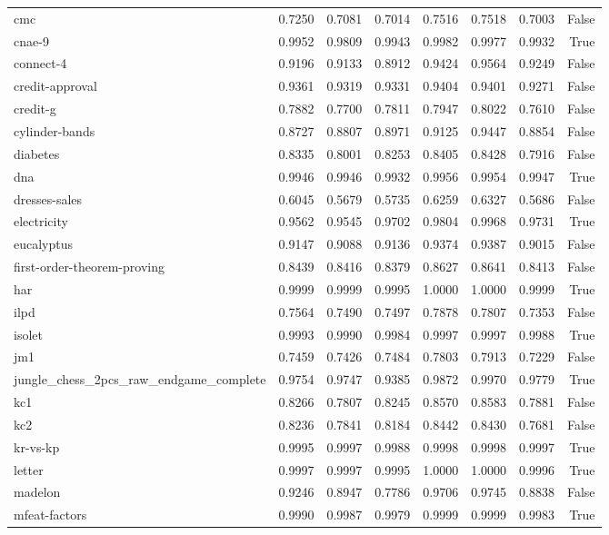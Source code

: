 \begin{table}[htbp]
\begin{tabular}{lrrrrrrr}
cmc & 0.7250 & 0.7081 & 0.7014 & 0.7516 & 0.7518 & 0.7003 & False \\
cnae-9 & 0.9952 & 0.9809 & 0.9943 & 0.9982 & 0.9977 & 0.9932 & True \\
connect-4 & 0.9196 & 0.9133 & 0.8912 & 0.9424 & 0.9564 & 0.9249 & False \\
credit-approval & 0.9361 & 0.9319 & 0.9331 & 0.9404 & 0.9401 & 0.9271 & False \\
credit-g & 0.7882 & 0.7700 & 0.7811 & 0.7947 & 0.8022 & 0.7610 & False \\
cylinder-bands & 0.8727 & 0.8807 & 0.8971 & 0.9125 & 0.9447 & 0.8854 & False \\
diabetes & 0.8335 & 0.8001 & 0.8253 & 0.8405 & 0.8428 & 0.7916 & False \\
dna & 0.9946 & 0.9946 & 0.9932 & 0.9956 & 0.9954 & 0.9947 & True \\
dresses-sales & 0.6045 & 0.5679 & 0.5735 & 0.6259 & 0.6327 & 0.5686 & False \\
electricity & 0.9562 & 0.9545 & 0.9702 & 0.9804 & 0.9968 & 0.9731 & True \\
eucalyptus & 0.9147 & 0.9088 & 0.9136 & 0.9374 & 0.9387 & 0.9015 & False \\
first-order-theorem-proving & 0.8439 & 0.8416 & 0.8379 & 0.8627 & 0.8641 & 0.8413 & False \\
har & 0.9999 & 0.9999 & 0.9995 & 1.0000 & 1.0000 & 0.9999 & True \\
ilpd & 0.7564 & 0.7490 & 0.7497 & 0.7878 & 0.7807 & 0.7353 & False \\
isolet & 0.9993 & 0.9990 & 0.9984 & 0.9997 & 0.9997 & 0.9988 & True \\
jm1 & 0.7459 & 0.7426 & 0.7484 & 0.7803 & 0.7913 & 0.7229 & False \\
jungle\_chess\_2pcs\_raw\_endgame\_complete & 0.9754 & 0.9747 & 0.9385 & 0.9872 & 0.9970 & 0.9779 & True \\
kc1 & 0.8266 & 0.7807 & 0.8245 & 0.8570 & 0.8583 & 0.7881 & False \\
kc2 & 0.8236 & 0.7841 & 0.8184 & 0.8442 & 0.8430 & 0.7681 & False \\
kr-vs-kp & 0.9995 & 0.9997 & 0.9988 & 0.9998 & 0.9998 & 0.9997 & True \\
letter & 0.9997 & 0.9997 & 0.9995 & 1.0000 & 1.0000 & 0.9996 & True \\
madelon & 0.9246 & 0.8947 & 0.7786 & 0.9706 & 0.9745 & 0.8838 & False \\
mfeat-factors & 0.9990 & 0.9987 & 0.9979 & 0.9999 & 0.9999 & 0.9983 & True \\

\end{tabular}
\end{table}
